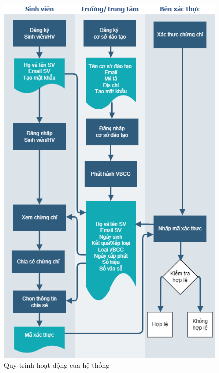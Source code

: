 \begin{figure}[htbp]
\centering
\includegraphics[width=.8\linewidth]{img/vbcc_diagram2.png}
\caption{Quy trình hoạt động của hệ thống}
\label{fig:vbcc_diagram}
\end{figure}

